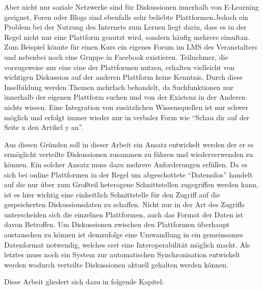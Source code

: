 Aber nicht nur soziale Netzwerke sind für Diskussionen innerhalb von E-Learning geeignet, Foren oder Blogs sind ebenfalls sehr beliebte Plattformen.Jedoch ein Problem bei der Nutzung des Internets zum Lernen liegt darin, dass es in der Regel nicht nur eine Plattform genutzt wird, sondern häufig mehrere simultan. Zum Beispiel könnte für einen Kurs ein eigenes Forum im LMS des Veranstalters und nebenbei noch eine Gruppe in Facebook existieren. Teilnehmer, die vorzugsweise nur eine eine der Plattformen nutzen, erhalten vielleicht von wichtigen Diskussion auf der anderen Plattform keine Kenntnis. Durch diese Inselbildung werden Themen mehrfach behandelt, da Suchfunktionen nur innerhalb der eigenen Plattform suchen und von der Existenz in der Anderen nichts wissen. Eine Integration von zusätzlichen Wissensquellen ist nur schwer möglich und erfolgt immer wieder nur in verbaler Form wie \enquote{Schau dir auf der Seite x den Artikel y an}.

Aus diesen Gründen soll in dieser Arbeit ein Ansatz entwickelt werden der er es ermöglicht verteilte Diskussionen zusammen zu führen und wiederverwenden zu können. Ein solcher Ansatz muss dazu mehrere Anforderungen erfüllen. Da es sich bei online Plattformen in der Regel um abgeschottete \enquote{Datensilos}\cite{Berners-Lee2011} handelt auf die nur über zum Großteil heterogene Schnittstellen zugegriffen werden kann, ist es hier wichtig eine einheitlich Schnittstelle für den Zugriff auf die gespeicherten Diskussionsdaten zu schaffen. Nicht nur in der Art des Zugriffs unterscheiden sich die einzelnen Plattformen, auch das Format der Daten ist davon Betroffen. Um Diskussionen zwischen den Plattformen überhaupt austauschen zu können ist demzufolge eine Umwandlung in ein gemeinsames Datenformat notwendig, welches erst eine Interoperabilität möglich macht. Als letztes muss noch ein System zur automatischen Synchronisation entwickelt werden wodurch verteilte Diskussionen aktuell gehalten werden können.

Diese Arbeit gliedert sich dazu in folgende Kapitel:


